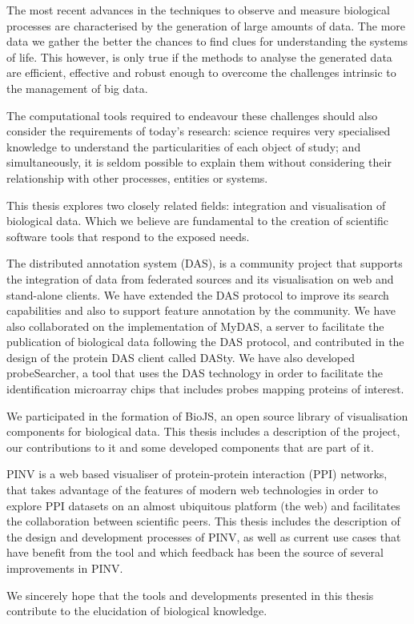
The most recent advances in the techniques to observe and measure biological processes are characterised by the generation of large amounts of data. The more data we gather the better the chances to find clues for understanding the systems of life. This however, is only true if the methods to analyse the generated data are efficient, effective and robust enough to overcome the challenges intrinsic to the management of big data.

The computational tools required to endeavour these challenges should also consider the requirements of today's research: science requires very specialised knowledge to understand the particularities of each object of study; and simultaneously, it is seldom possible to explain them without considering their relationship with other processes, entities or systems.

This thesis explores two closely related fields: integration and visualisation of biological data. Which we believe are fundamental to the creation of scientific software tools that respond to the exposed needs.

The distributed annotation system (DAS), is a community project that supports the integration of data from federated sources and its visualisation on web and stand-alone clients. We have extended the DAS protocol to improve its search capabilities and also to support feature annotation by the community. We have also collaborated on the implementation of MyDAS, a server to facilitate the publication of biological data following the DAS protocol, and contributed in the design of the protein DAS client called DASty. We have also developed probeSearcher, a tool that uses the DAS technology in order to facilitate the identification microarray chips that includes probes mapping proteins of interest.

We participated in the formation of BioJS, an open source library of visualisation components for biological data. This thesis includes a description of the project, our contributions to it and some developed components that are part of it.

PINV is a web based visualiser of protein-protein interaction (PPI) networks, that takes advantage of the features of modern web technologies in order to explore PPI datasets on an almost ubiquitous platform (the web) and facilitates the collaboration between scientific peers. This thesis includes the description of the design and development processes of PINV, as well as current use cases that have benefit from the tool and which feedback has been the source of several improvements in PINV.

We sincerely hope that  the tools and developments presented in this thesis contribute to the elucidation of biological knowledge.